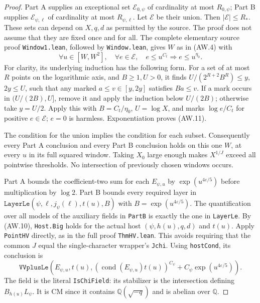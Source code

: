 \begin{proof}
Part A supplies an exceptional set $\mathcal E_{0,\psi}$ of
cardinality at most $R_{0,\psi}$; Part B supplies
$\mathcal E_{\psi,\ell}$ of cardinality at most $R_{\psi,\ell}$.
Let $\mathcal E$ be their union.  Then $|\mathcal E|\leq R_*$.
These sets can depend on $X,q,d$ as permitted by the source.
The proof does not assume that they are fixed once and for all.
The complete elementary source proof \texttt{Window1.lean},
followed by \texttt{Window.lean}, gives $W$ as in (AW.4) with
\[
 \forall u\in[W,W^2],\quad
 \forall e\in\mathcal E,\quad e\leq u^{C_t}
                          \Longrightarrow e\leq u^{\eta_0}.
                                                                    \tag{AW.11}
\]
For clarity, its underlying induction has the following form.
For a set of at most $R$ points on the logarithmic axis, and
$B\geq1,U>0$, it finds
$U/(2^{R+2}B^R)\leq y$, $2y\leq U$, such that any marked
$a\leq v\in[y,2y]$ satisfies $Ba\leq v$.
If a mark occurs in $(U/(2B),U]$, remove it and apply the
induction below $U/(2B)$; otherwise take $y=U/2$.
Apply this with $B=C_t/\eta_0$, $U=\log X$, and marks
$\log e/C_t$ for positive $e\in\mathcal E$; $e=0$ is harmless.
Exponentiation proves (AW.11).

The condition for the union implies the condition for each subset.
Consequently every Part A conclusion and every Part B conclusion
holds on this one $W$, at every $u$ in its full squared window.
Taking $X_0$ large enough makes $X^{1/J}$ exceed all pointwise
thresholds.  No intersection of previously chosen windows occurs.

Part A bounds the coefficient-two sum for each $E_{\psi,u}$ by
$\exp(u^{4\varepsilon/5})$ before multiplication by $\log2$.
Part B bounds every required layer in
$\texttt{LayerLe}(\psi,\ell,j_\psi(\ell),t(u),B)$ with
$B=\exp(u^{4\varepsilon/5})$.
The quantification over all models of the auxiliary fields in
\texttt{PartB} is exactly the one in \texttt{LayerLe}.
By (AW.10), \texttt{Host.Big} holds for the actual host
$(\psi,h(u),q,d)$ and $t(u)$.
Apply \texttt{PointHV} directly, as in the full proof
\texttt{ThmHV.lean}.  This avoids requiring that the common $J$
equal the single-character wrapper's \texttt{Jchi}.
Using \texttt{hostCond}, its conclusion is
\[
 \texttt{VVplusLe}\left(E_{\psi,u},t(u),
       (\operatorname{cond}(E_{\psi,u})t(u))^{C_\psi}
              +C_\psi\exp(u^{4\varepsilon/5})\right).          \tag{AW.12}
\]
The field is the literal \texttt{IsChiField}: its stabilizer is
the intersection defining $B_{h(u)}L_\psi$.
It is CM since it contains $\mathbb Q(\sqrt{-q})$ and is abelian
over $\mathbb Q$.


\end{proof}
